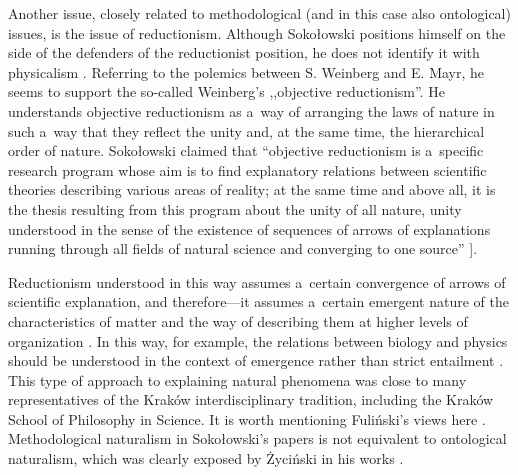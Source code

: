 \documentclass[%
  manuscript=article,
  year=2024,
  volume=77,
  doi=00000.000,
]{zfn}
\begin{document}
Another issue, closely related to methodological (and in this case also ontological) issues, is the issue of reductionism. Although Sokołowski positions himself on the side of the defenders of the reductionist position, he does not identify it with physicalism 
\parencite[][]{Sokoowski1999Maa}. %
 Referring to the polemics between S. Weinberg and E. Mayr, he seems to support the so-called Weinberg's ,,objective reductionism''. He understands objective reductionism as a~way of arranging the laws of nature in such a~way that they reflect the unity and, at the same time, the hierarchical order of nature. Sokołowski claimed that ``objective reductionism is a~specific research program whose aim is to find explanatory relations between scientific theories describing various areas of reality; at the same time and above all, it is the thesis resulting from this program about the unity of all nature, unity understood in the sense of the existence of sequences of arrows of explanations running through all fields of natural science and converging to one source''
\parencite[][p.75]{Sokoowski1999Maa}%
].



Reductionism understood in this way assumes a~certain convergence of arrows of scientific explanation, and therefore---it assumes a~certain emergent nature of the characteristics of matter and the way of describing them at higher levels of organization 
\parencite[see][]{Sokoowski2006Teorie}. %
 In this way, for example, the relations between biology and physics should be understood in the context of emergence rather than strict entailment 
\parencite[][p.216]{Sokoowski2001Wspoczesne}. %
 This type of approach to explaining natural phenomena was close to many representatives of the Kraków interdisciplinary tradition, including the Kraków School of Philosophy in Science. It is worth mentioning Fuliński's views here 
\parencite[e.g.,][]{Fulinski1993O}. %
 Methodological naturalism in Sokołowski's papers is not equivalent to ontological naturalism, which was clearly exposed by Życiński in his works 
\parencite[][]{Zycinski2003Naturalizm}.%
\end{document}
